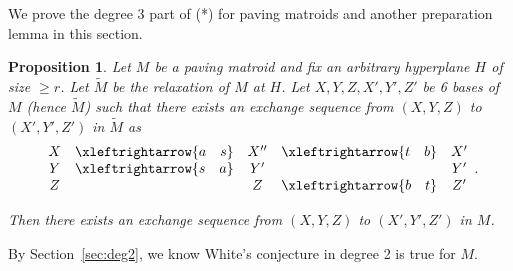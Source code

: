 \documentclass{amsart}
\newtheorem{proposition}[theorem]{Proposition}
\newcommand{\swap}[2]{\xleftrightarrow{#1 \quad #2}}
\begin{document}
We prove the degree 3 part of (*) for paving matroids and another preparation lemma in this section.

\begin{proposition} \label{prop:XYZ_XYZ}
    Let $M$ be a paving matroid and fix an arbitrary hyperplane $H$ of size $\geq r$. Let $\widetilde{M}$ be the relaxation of $M$ at $H$. Let $X,Y,Z,X',Y',Z'$ be 6 bases of $M$ (hence $\widetilde{M}$) such that there exists an exchange sequence from $(X,Y,Z)$ to $(X',Y',Z')$ in $\widetilde{M}$ as
\begin{equation} \label{eq:deg3}
\begin{array}{c c c c c}
   X   & \swap{a}{s} & X''   & \swap{t}{b} & X' \\
   Y & \swap{s}{a} & Y' &             & Y' \\
   Z &             & Z  & \swap{b}{t} & Z'
\end{array}.
\end{equation}

Then there exists an exchange sequence from $(X,Y,Z)$ to $(X',Y',Z')$ in $M$.
\end{proposition}

By Section~\ref{sec:deg2}, we know White's conjecture in degree 2 is true for $M$.
\end{document}
